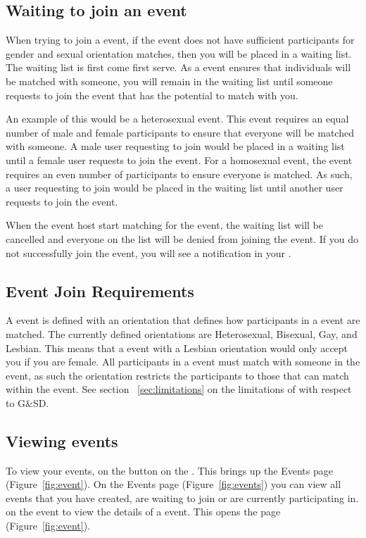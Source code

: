 \subsection{Waiting to join an event}
\label{sec:events-wait}
When trying to join a event, if the event does not have sufficient participants for gender and sexual orientation matches, then you will be placed in a waiting list.  The waiting list is first come first serve.  As a event ensures that individuals will be matched with someone, you will remain in the waiting list until someone requests to join the event that has the potential to match with you. 

An example of this would be a heterosexual event.  This event requires an equal number of male and female participants to ensure that everyone will be matched with someone.  A male user requesting to join would be placed in a waiting list until a female user requests to join the event.  For a homosexual event, the event requires an even number of participants to ensure everyone is matched.  As such, a user requesting to join would be placed in the waiting list until another user requests to join the event.

When the event host start matching for the event, the waiting list will be cancelled and everyone on the list will be denied from joining the event.  If you do not successfully join the event, you will see a notification in your .

\subsection{Event Join Requirements}
\label{sec:events-req}
A event is defined with an orientation that defines how participants in a event are matched.  The currently defined orientations are Heterosexual, Bisexual, Gay, and Lesbian.  This means that a event with a Lesbian orientation would only accept you if you are female.  All participants in a event must match with someone in the event, as such the orientation restricts the participants to those that can match within the event.  See section ~\ref{sec:limitations} on the limitations of \Friending{} with respect to G\&SD.

\subsection{Viewing events}
\label{sec:events-view}
To view your events,  on the  button on the \quicknav. This brings up the Events page (Figure~\ref{fig:event}). On the Events page (Figure~\ref{fig:events}) you can view all events that you have created, are waiting to join or are currently participating in.   on the event to view the details of a event.  This opens the  page (Figure~\ref{fig:event}).  

